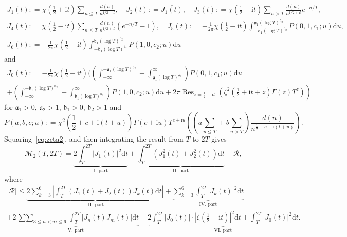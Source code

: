 \documentclass[a4paper,reqno]{amsart}
\theoremstyle{definition}
\newcommand{\de}[0]{\mathrel{\mathop:}=}
\newcommand{\ie}[0]{\mathrm{i}}
\newcommand{\dif}[1]{\mathrm{d}#1}
\DeclareMathOperator*{\Res}{Res}
\begin{document}
\begin{gather*}
J_1(t) \de \chi{\left(\frac{1}{2}+\ie t\right)}\sum_{n\leq T}\frac{d(n)}{n^{1/2-\ie t}}, \quad J_2(t)\de \overline{J_1(t)}, \quad J_3(t)\de \chi{\left(\frac{1}{2}-\ie t\right)}\sum_{n>T}\frac{d(n)}{n^{1/2+\ie t}}e^{-n/T}, \\
J_4(t) \de \chi{\left(\frac{1}{2}-\ie t\right)}\sum_{n\leq T}\frac{d(n)}{n^{1/2+\ie t}}\left(e^{-n/T}-1\right), \quad 
J_5(t)\de -\frac{1}{2\pi}\chi{\left(\frac{1}{2}-\ie t\right)}\int_{-\mathfrak{a}_1\left(\log{T}\right)^{\mathfrak{a}_2}}^{\mathfrak{a}_1\left(\log{T}\right)^{\mathfrak{a}_2}}P(0,1,c_1;u)\dif{u}, \\
J_6(t)\de -\frac{1}{2\pi}\chi{\left(\frac{1}{2}-\ie t\right)}\int_{-\mathfrak{b}_1\left(\log{T}\right)^{\mathfrak{b}_2}}^{\mathfrak{b}_1\left(\log{T}\right)^{\mathfrak{b}_2}}P(1,0,c_2;u)\dif{u}
\end{gather*}
and
\begin{multline*}
J_0(t) \de -\frac{1}{2\pi}\chi{\left(\frac{1}{2}-\ie t\right)}\Biggl(\left(\int_{-\infty}^{-\mathfrak{a}_1\left(\log{T}\right)^{\mathfrak{a}_2}}+\int_{\mathfrak{a}_1\left(\log{T}\right)^{\mathfrak{a}_2}}^{\infty}\right)P(0,1,c_1;u)\dif{u} \\
\left.+\left(\int_{-\infty}^{-\mathfrak{b}_1\left(\log{T}\right)^{\mathfrak{b}_2}}+\int_{\mathfrak{b}_1\left(\log{T}\right)^{\mathfrak{b}_2}}^{\infty}\right)P(1,0,c_2;u)\dif{u}+2\pi \Res_{z=\frac{1}{2}-\ie t}\left(\zeta^{2}{\left(\frac{1}{2}+\ie t+z\right)}\Gamma(z)T^{z}\right)\right)
\end{multline*}
for $\mathfrak{a}_1>0$, $\mathfrak{a}_2>1$, $\mathfrak{b}_1>0$, $\mathfrak{b}_2>1$ and
\[
P(a,b,c;u)\de \chi^{2}\left(\frac{1}{2}+c+\ie(t+u)\right)\Gamma\left(c+\ie u\right)T^{c+\ie u}\left(\left(a\sum_{n\leq T}+b\sum_{n>T}\right)\frac{d(n)}{n^{\frac{1}{2}-c-\ie(t+u)}}\right).
\]
Squaring~\eqref{eq:zeta2}, and then integrating the result from $T$ to $2T$ gives
\begin{equation}
\label{eq:4thPMmainEst}   
\mathcal{M}_{2}(T,2T) = \underbrace{2\int_{T}^{2T}\left|J_1(t)\right|^{2}\dif{t}}_{\text{I. part}} + \underbrace{\int_{T}^{2T}\left(J_1^2(t) + J_2^2(t)\right)\dif{t}}_{\text{II. part}} + \mathcal{R},
\end{equation}
where
\begin{multline}
\label{eq:4thPMtermR}
|\mathcal{R}| \leq \underbrace{2\sum_{k=3}^{6}\left|\int_{T}^{2T}\left(J_1(t)+J_2(t)\right)J_{k}(t)\dif{t}\right|}_{\text{III. part}} + \underbrace{\sum_{k=3}^{6}\int_{T}^{2T}\left|J_k(t)\right|^{2}\dif{t}}_{\text{IV. part}} \\ 
+ \underbrace{2\mathop{\sum\sum}_{3\leq n<m\leq 6}\int_{T}^{2T}\left|J_{n}(t)J_{m}(t)\right|\dif{t}}_{\text{V. part}} 
+ \underbrace{2\int_{T}^{2T}\left|J_0(t)\right|\cdot\left|\zeta\left(\frac{1}{2}+\ie t\right)\right|^{2}\dif{t} + \int_{T}^{2T}\left|J_0(t)\right|^{2}\dif{t}}_{\text{VI. part}}.
\end{multline}
\end{document}
